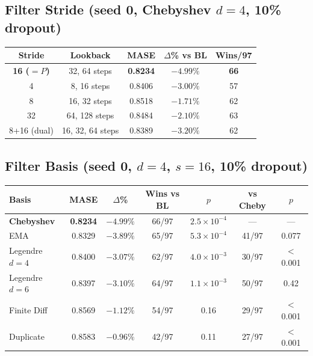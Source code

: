 \documentclass{article}
\begin{document}
\subsection{Filter Stride (seed 0, Chebyshev $d{=}4$, 10\% dropout)}

\begin{table}[h]
\centering
\small
\begin{tabular}{ccccc}
\toprule
\textbf{Stride} & \textbf{Lookback} & \textbf{MASE} & \textbf{$\Delta$\% vs BL} & \textbf{Wins/97} \\
\midrule
\textbf{16 ($=P$)} & 32, 64 steps & \textbf{0.8234} & $-4.99\%$ & \textbf{66} \\
4 & 8, 16 steps & 0.8406 & $-3.00\%$ & 57 \\
8 & 16, 32 steps & 0.8518 & $-1.71\%$ & 62 \\
32 & 64, 128 steps & 0.8484 & $-2.10\%$ & 63 \\
8+16 (dual) & 16, 32, 64 steps & 0.8389 & $-3.20\%$ & 62 \\
\bottomrule
\end{tabular}
\end{table}

\subsection{Filter Basis (seed 0, $d{=}4$, $s{=}16$, 10\% dropout)}

\begin{table}[h]
\centering
\small
\begin{tabular}{lcccccc}
\toprule
\textbf{Basis} & \textbf{MASE} & \textbf{$\Delta$\%} & \textbf{Wins vs BL} & \textbf{$p$} & \textbf{vs Cheby} & \textbf{$p$} \\
\midrule
\textbf{Chebyshev} & \textbf{0.8234} & $-4.99\%$ & 66/97 & $2.5 \times 10^{-4}$ & --- & --- \\
EMA & 0.8329 & $-3.89\%$ & 65/97 & $5.3 \times 10^{-4}$ & 41/97 & 0.077 \\
Legendre $d{=}4$ & 0.8400 & $-3.07\%$ & 62/97 & $4.0 \times 10^{-3}$ & 30/97 & $<$0.001 \\
Legendre $d{=}6$ & 0.8397 & $-3.10\%$ & 64/97 & $1.1 \times 10^{-3}$ & 50/97 & 0.42 \\
Finite Diff & 0.8569 & $-1.12\%$ & 54/97 & 0.16 & 29/97 & $<$0.001 \\
Duplicate & 0.8583 & $-0.96\%$ & 42/97 & 0.11 & 27/97 & $<$0.001 \\
\bottomrule
\end{tabular}
\end{table}
\end{document}
